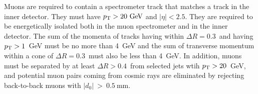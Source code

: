 Muons are required to contain a spectrometer track that matches a track in the inner detector.
They must have $\pt>20\GeV$ and $|\eta|<2.5$.
They are required to be energetically isolated both in the muon spectrometer and in the
inner detector.
The sum of the momenta of tracks having within $\Delta R = 0.3$\ and having $p_{\mathrm{T}}>1$~GeV
must be no more than 4~GeV and the sum of transverse momentum within
a cone of $\Delta R = 0.3$\ must also be less than 4~GeV.
In addition, muons must be separated by at least $\Delta R > 0.4$\ from
selected jets wtih $p_{\mathrm{T}}>20$~GeV, and potential muon pairs coming from
cosmic rays are eliminated by rejecting back-to-back muons with $|d_0|~>~0.5~$mm.






